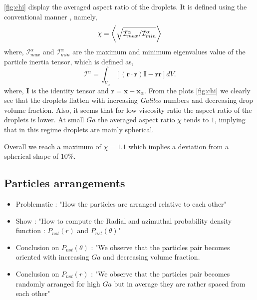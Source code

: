 \ref{fig:chi} display the averaged aspect ratio of the droplets.
It is defined using the conventional manner \citep{bunner2003effect}, namely,
\begin{equation}
    \chi = \left<\sqrt{\mathcal{I}_{max}^\alpha /\mathcal{I}_{min}^\alpha}\right>
\end{equation} 
where, $\mathcal{I}_{max}^\alpha$ and $\mathcal{I}_{min}^\alpha$ are the maximum and minimum eigenvalues value of the particle inertia tensor, which is defined as, 
\begin{equation*}
    \mathcal{I}^\alpha
    = \int_{V_\alpha} \left[
        (\textbf{r}\cdot \textbf{r}) \textbf{I}  - \textbf{rr}
        \right]
    dV.
\end{equation*}
where, \textbf{I} is the identity tensor and $\textbf{r} = \textbf{x} - \textbf{x}_\alpha$. 
From the plots \ref{fig:chi} we clearly see that the droplets flatten with increasing \textit{Galileo} numbers and decreasing drop volume fraction. 
Also, it seems that for low viscosity ratio the aspect ratio of the droplets is lower. 
At small $Ga$ the averaged aspect ratio $\chi$ tends to $1$, implying that in this regime droplets are mainly spherical. 

Overall we reach a maximum of $\chi = 1.1$ which implies a deviation from a spherical shape of $10 \%$. 


\subsection{Particles arrangements}
\begin{itemize}
    \item Problematic : "How the particles are arranged relative to each other"
    \item Show : "How to compute the Radial and azimuthal probability density function : $P_{nst}(r)$  and $P_{nst}(\theta)$"
    \item  Conclusion on $P_{nst}(\theta)$ : "We observe that the particles pair becomes oriented with increasing $Ga$ and decreasing volume fraction.
    \item  Conclusion on $P_{nst}(r)$ : "We observe that the particles pair becomes randomly arranged for high $Ga$ but in average they are rather spaced from each other" 
\end{itemize}

